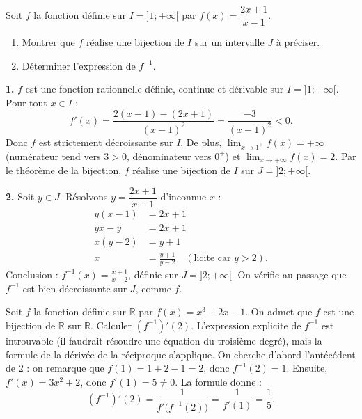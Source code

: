 \documentclass[11pt]{article}
\begin{document}
\begin{exoresolu}
Soit $f$ la fonction définie sur $I = ]1 ; +\infty[$ par $f(x) = \dfrac{2x + 1}{x - 1}$.
\begin{enumerate}
\item Montrer que $f$ réalise une bijection de $I$ sur un intervalle $J$ à préciser.
\item Déterminer l'expression de $f^{-1}$.
\end{enumerate}
\tcblower
\textbf{1.} $f$ est une fonction rationnelle définie, continue et dérivable sur $I = ]1 ; +\infty[$. Pour tout $x \in I$ :
\[ f'(x) = \frac{2(x-1) - (2x+1)}{(x-1)^2} = \frac{-3}{(x-1)^2} < 0. \]
Donc $f$ est strictement décroissante sur $I$. De plus, $\displaystyle\lim_{x \to 1^+} f(x) = +\infty$ (numérateur tend vers $3 > 0$, dénominateur vers $0^+$) et $\displaystyle\lim_{x \to +\infty} f(x) = 2$. Par le théorème de la bijection, $f$ réalise une bijection de $I$ sur $J = ]2 ; +\infty[$.

\textbf{2.} Soit $y \in J$. Résolvons $y = \dfrac{2x+1}{x-1}$ d'inconnue $x$ :
\begin{align*}
y(x-1) &= 2x + 1 \\
yx - y &= 2x + 1 \\
x(y - 2) &= y + 1 \\
x &= \frac{y+1}{y-2} \quad (\text{licite car } y > 2).
\end{align*}
Conclusion : $\displaystyle f^{-1}(x) = \frac{x+1}{x-2}$, définie sur $J = ]2 ; +\infty[$. On vérifie au passage que $f^{-1}$ est bien décroissante sur $J$, comme $f$.
\end{exoresolu}

\begin{exoresolu}
Soit $f$ la fonction définie sur $\mathbb{R}$ par $f(x) = x^3 + 2x - 1$. On admet que $f$ est une bijection de $\mathbb{R}$ sur $\mathbb{R}$. Calculer $\left(f^{-1}\right)'(2)$.
\tcblower
L'expression explicite de $f^{-1}$ est introuvable (il faudrait résoudre une équation du troisième degré), mais la formule de la dérivée de la réciproque s'applique. On cherche d'abord l'antécédent de $2$ : on remarque que $f(1) = 1 + 2 - 1 = 2$, donc $f^{-1}(2) = 1$.
Ensuite, $f'(x) = 3x^2 + 2$, donc $f'(1) = 5 \neq 0$. La formule donne :
\[ \left(f^{-1}\right)'(2) = \frac{1}{f'\bigl(f^{-1}(2)\bigr)} = \frac{1}{f'(1)} = \frac{1}{5}. \]
\end{exoresolu}
\end{document}
